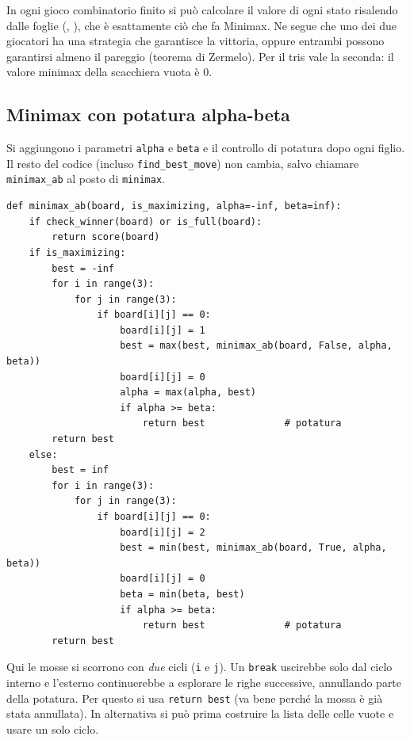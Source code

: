 \begin{center}
\end{center}

\begin{extra}
In ogni gioco combinatorio finito si può calcolare il valore di ogni stato risalendo dalle foglie
(, ), che è esattamente ciò che fa Minimax.
Ne segue che uno dei due giocatori ha una strategia che garantisce la vittoria, oppure entrambi
possono garantirsi almeno il pareggio (teorema di Zermelo). Per il tris vale la seconda:
il valore minimax della scacchiera vuota è $0$.
\end{extra}

\subsection{Minimax con potatura alpha-beta}

Si aggiungono i parametri \texttt{alpha} e \texttt{beta} e il controllo di potatura dopo ogni
figlio. Il resto del codice (incluso \texttt{find\_best\_move}) non cambia, salvo chiamare
\texttt{minimax\_ab} al posto di \texttt{minimax}.

\begin{lstlisting}
def minimax_ab(board, is_maximizing, alpha=-inf, beta=inf):
    if check_winner(board) or is_full(board):
        return score(board)
    if is_maximizing:
        best = -inf
        for i in range(3):
            for j in range(3):
                if board[i][j] == 0:
                    board[i][j] = 1
                    best = max(best, minimax_ab(board, False, alpha, beta))
                    board[i][j] = 0
                    alpha = max(alpha, best)
                    if alpha >= beta:
                        return best              # potatura
        return best
    else:
        best = inf
        for i in range(3):
            for j in range(3):
                if board[i][j] == 0:
                    board[i][j] = 2
                    best = min(best, minimax_ab(board, True, alpha, beta))
                    board[i][j] = 0
                    beta = min(beta, best)
                    if alpha >= beta:
                        return best              # potatura
        return best
\end{lstlisting}

\begin{attenzione}
Qui le mosse si scorrono con \emph{due} cicli (\texttt{i} e \texttt{j}). Un \texttt{break}
uscirebbe solo dal ciclo interno e l'esterno continuerebbe a esplorare le righe successive,
annullando parte della potatura. Per questo si usa \texttt{return best} (va bene perché la mossa
è già stata annullata). In alternativa si può prima costruire la lista delle celle vuote e
usare un solo ciclo.
\end{attenzione}

